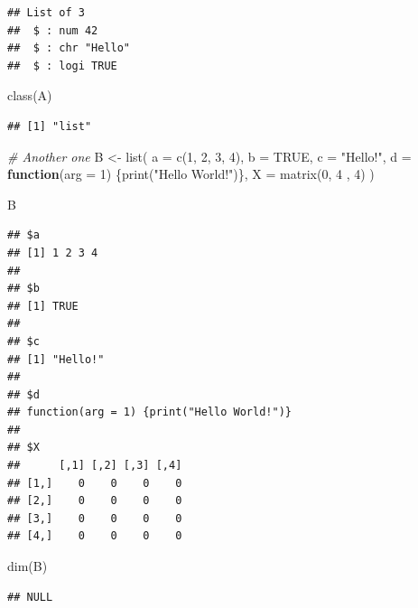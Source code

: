 \documentclass[
]{book}
\newenvironment{Shaded}{\begin{snugshade}}{\end{snugshade}}
\newcommand{\AttributeTok}[1]{\textcolor[rgb]{0.77,0.63,0.00}{#1}}
\newcommand{\CommentTok}[1]{\textcolor[rgb]{0.56,0.35,0.01}{\textit{#1}}}
\newcommand{\ConstantTok}[1]{\textcolor[rgb]{0.00,0.00,0.00}{#1}}
\newcommand{\ControlFlowTok}[1]{\textcolor[rgb]{0.13,0.29,0.53}{\textbf{#1}}}
\newcommand{\DecValTok}[1]{\textcolor[rgb]{0.00,0.00,0.81}{#1}}
\newcommand{\FunctionTok}[1]{\textcolor[rgb]{0.00,0.00,0.00}{#1}}
\newcommand{\NormalTok}[1]{#1}
\newcommand{\OtherTok}[1]{\textcolor[rgb]{0.56,0.35,0.01}{#1}}
\newcommand{\StringTok}[1]{\textcolor[rgb]{0.31,0.60,0.02}{#1}}
\begin{document}
\begin{verbatim}
## List of 3
##  $ : num 42
##  $ : chr "Hello"
##  $ : logi TRUE
\end{verbatim}

\begin{Shaded}
\begin{Highlighting}[]
\FunctionTok{class}\NormalTok{(A)}
\end{Highlighting}
\end{Shaded}

\begin{verbatim}
## [1] "list"
\end{verbatim}

\begin{Shaded}
\begin{Highlighting}[]
\CommentTok{\# Another one}
\NormalTok{B }\OtherTok{\textless{}{-}} \FunctionTok{list}\NormalTok{(}
          \AttributeTok{a =} \FunctionTok{c}\NormalTok{(}\DecValTok{1}\NormalTok{, }\DecValTok{2}\NormalTok{, }\DecValTok{3}\NormalTok{, }\DecValTok{4}\NormalTok{),}
          \AttributeTok{b =} \ConstantTok{TRUE}\NormalTok{,}
          \AttributeTok{c =} \StringTok{"Hello!"}\NormalTok{,}
          \AttributeTok{d =} \ControlFlowTok{function}\NormalTok{(}\AttributeTok{arg =} \DecValTok{1}\NormalTok{) \{}\FunctionTok{print}\NormalTok{(}\StringTok{"Hello World!"}\NormalTok{)\},}
          \AttributeTok{X =} \FunctionTok{matrix}\NormalTok{(}\DecValTok{0}\NormalTok{, }\DecValTok{4}\NormalTok{ , }\DecValTok{4}\NormalTok{)}
\NormalTok{)}

\NormalTok{B}
\end{Highlighting}
\end{Shaded}

\begin{verbatim}
## $a
## [1] 1 2 3 4
## 
## $b
## [1] TRUE
## 
## $c
## [1] "Hello!"
## 
## $d
## function(arg = 1) {print("Hello World!")}
## 
## $X
##      [,1] [,2] [,3] [,4]
## [1,]    0    0    0    0
## [2,]    0    0    0    0
## [3,]    0    0    0    0
## [4,]    0    0    0    0
\end{verbatim}

\begin{Shaded}
\begin{Highlighting}[]
\FunctionTok{dim}\NormalTok{(B)}
\end{Highlighting}
\end{Shaded}

\begin{verbatim}
## NULL
\end{verbatim}
\end{document}
